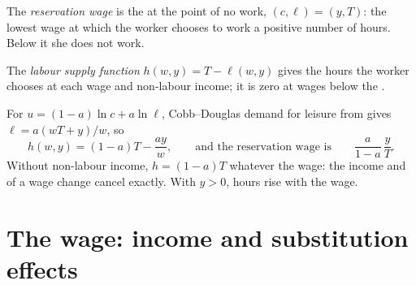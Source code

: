 \begin{definition}\label{def:b1:labour-supply-and-saving:reservation-wage}
The \emph{reservation wage} is the  at the point of no work, $(c, \ell) = (y, T)$:
the lowest wage at which the worker chooses to work a positive number of
hours. Below it she does not work.
\end{definition}

\begin{definition}\label{def:b1:labour-supply-and-saving:labour-supply}
The \emph{labour supply function} $h(w, y) = T - \ell(w, y)$ gives the hours the
worker chooses at each wage and non-labour income; it is zero at wages
below the .
\end{definition}

For $u = (1 - a)\ln c + a\ln\ell$, Cobb--Douglas demand for leisure from  gives $\ell = a(wT + y)/w$, so
\[
h(w, y) = (1 - a)T - \frac{ay}{w},
\qquad\text{and the reservation wage is}\qquad \frac{a}{1 - a}\,\frac{y}{T}.
\]
Without non-labour income, $h = (1 - a)T$ whatever the wage: the income and
 of a wage change cancel exactly. With $y > 0$, hours
rise with the wage.

\section{The wage: income and substitution effects}\label{sec:b1:labour-supply-and-saving:wage}


